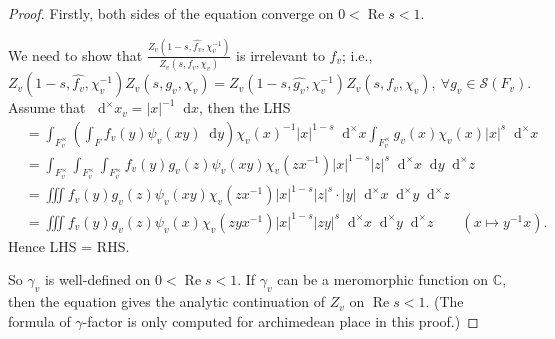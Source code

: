 \documentclass{article}
\newtheorem{theorem}{Theorem}
\theoremstyle{definition}
\theoremstyle{remark}
\renewcommand{\Re}{\mathop{\mathrm{Re}}}
\renewcommand{\hat}{\widehat}
\newcommand{\C}{\mathbb{C}}
\newcommand{\dx}{\mathop{}\!\mathrm{d}x}
\newcommand{\dxm}{\mathop{}\!\mathrm{d}^{\times}x}
\newcommand{\dy}{\mathop{}\!\mathrm{d}y}
\newcommand{\dym}{\mathop{}\!\mathrm{d}^{\times}y}
\newcommand{\dzm}{\mathop{}\!\mathrm{d}^{\times}z}
\begin{document}
\begin{proof}
    Firstly, both sides of the equation converge on $0 < \Re s < 1$. 

    We need to show that $\frac{Z_v(1-s, \hat{f_v}, \chi_v^{-1})}{Z_v(s, f_v, \chi_v)}$ is irrelevant to $f_v$; i.e.,\[Z_v(1-s, \hat{f_v}, \chi_v^{-1})Z_v(s, g_v, \chi_v) = Z_v(1-s, \hat{g_v}, \chi_v^{-1})Z_v(s, f_v, \chi_v),\ \forall g_v\in\mathcal{S}(F_v).\]
    Assume that $\dxm_v = |x|^{-1}\dx$, then the LHS \begin{align*}
        &= \int_{F_v^{\times}} \left( \int_F f_v(y)\psi_v(xy)\dy \right)\chi_v(x)^{-1}|x|^{1-s}\dxm\int_{F_v^\times} g_v(x)\chi_v(x)|x|^s\dxm \\
        &= \int_{F_v^\times}\int_{F_v^\times}\int_{F_v^\times} f_v(y)g_v(z)\psi_v(xy)\chi_v(zx^{-1})|x|^{1-s}|z|^s\dxm\dy\dzm\\
        &= \iiint f_v(y)g_v(z)\psi_v(xy)\chi_v(zx^{-1})|x|^{1-s}|z|^s\cdot|y|\dxm\dym\dzm\\
        &= \iiint f_v(y)g_v(z)\psi_v(x)\chi_v(zyx^{-1})|x|^{1-s}|zy|^s\dxm\dym\dzm \qquad (x\mapsto y^{-1}x).
    \end{align*}
    Hence LHS = RHS.

    So $\gamma_v$ is well-defined on $0 < \Re s < 1$. If $\gamma_v$ can be a meromorphic function on $\C$, then the equation gives the analytic continuation of $Z_v$ on $\Re s < 1$.
    (The formula of $\gamma$-factor is only computed for archimedean place in this proof.)


\end{proof}
\end{document}
